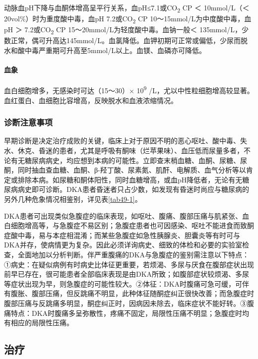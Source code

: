 动脉血pH下降与血酮体增高呈平行关系，血pH≤7.1或CO\textsubscript{2} CP ＜
10mmol/L（＜ 20vol\%）时为重度酸中毒，血pH 7.2或CO\textsubscript{2} CP
10～15mmol/L为中度酸中毒，血pH ＞ 7.2或CO\textsubscript{2} CP
15～20mmol/L为轻度酸中毒。血钠一般＜
135mmol/L，少数正常，偶可升高达145mmol/L。血氯降低。血钾初期可正常或偏低，少尿而脱水和酸中毒严重期可升高至5mmol/L以上。血镁、血磷亦可降低。

\paragraph{血象}

血白细胞增多，无感染时可达（15～30）× 10\textsuperscript{9}
/L，尤以中性粒细胞增高较显著。血红蛋白、血细胞比容增高，反映脱水和血液浓缩情况。

\subsubsection{诊断注意事项}

早期诊断是决定治疗成败的关键，临床上对于原因不明的恶心呕吐、酸中毒、失水、休克、昏迷的患者，尤其是呼吸有酮味（烂苹果味）、血压低而尿量多者，不论有无糖尿病病史，均应想到本病的可能性。立即查末梢血糖、血酮、尿糖、尿酮，同时抽血查血糖、血酮、β-羟丁酸、尿素氮、肌酐、电解质、血气分析等以肯定或排除本病。如尿糖和酮体阳性，同时血糖增高，或血pH降低者，无论有无糖尿病病史即可诊断。DKA患者昏迷者只占少数，如发现有昏迷时尚应与糖尿病的另外几种危象情况相鉴别，详见表\ref{tab49-1}。

DKA患者可出现类似急腹症的临床表现，如呕吐、腹痛、腹部压痛与肌紧张、血白细胞增高等，与急腹症不易区别；急腹症患者也可因感染、呕吐不能进食而致酮症酸中毒，易与本症相混淆；而某些急腹症如急性胰腺炎、胆囊炎等有时可与DKA并存，使病情更为复杂。因此必须详询病史、细致的体检和必要的实验室检查，全面地加以分析判断。伴严重腹痛的DKA与急腹症的鉴别需注意以下特点：①病史：在疑似病例有时病史比体征更重要，若烦渴、多尿与厌食在腹部症状出现前早已存在，很可能患者全部临床表现是由DKA所致；如腹部症状较烦渴、多尿等症状出现为早，则急腹症的可能性较大。②体征：DKA时腹痛可急可缓，可伴有腹胀、腹部压痛，但反跳痛不明显，此种体征随酮症纠正很快改善；而急腹症时腹部压痛与反跳痛多明显，酮症纠正时，因病因未除去，临床症状不能好转。③腹痛特点：DKA时腹痛多呈弥散性，疼痛不固定，局限性压痛不明显；急腹症时均有相应的局限性压痛。

\subsection{治疗}

